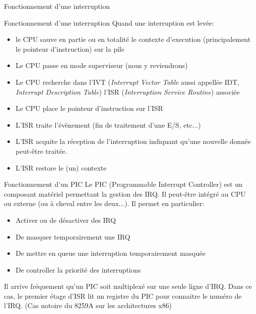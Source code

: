 \begin{frame}{Fonctionnement d'une interruption}
  \begin{center}
  \end{center}
\end{frame}

\begin{frame}{Fonctionnement d'une interruption}
  Quand une  interruption est levée:
  \begin{itemize}
  \item le CPU sauve en  partie ou en totalité le contexte d'execution
    (principalement le pointeur d'instruction) sur la pile
  \item Le CPU passe en mode superviseur (nous y reviendrons)
  \item  Le CPU  recherche dans  l'IVT (\emph{Interrupt  Vector Table}
    aussi  appellée  IDT,  \emph{Interrupt  Description  Table})  l'ISR
    (\emph{Interruption Service Routine}) associée
  \item Le CPU place le pointeur d'instruction sur l'ISR
  \item  L'ISR traite  l'évènement (fin  de traitement  d'une E/S,
    etc...)
  \item L'ISR acquite la  réception de l'interruption indiquant qu'une
    nouvelle  donnée peut-être  traitée.
  \item L'ISR restore le (un) contexte
  \end{itemize}
\end{frame}

\begin{frame}{Fonctionnement d'un PIC}
  Le PIC (Programmable Interrupt Controller) est un composant matériel
  permettant  la gestion  des  IRQ.  Il peut-être  intégré  au CPU  ou
  externe (ou à cheval entre les deux...). Il permet en particulier:
  \begin{itemize}
  \item Activer ou de désactiver des IRQ
  \item De masquer temporairement une IRQ
  \item De mettre en queue une interruption temporairement masquée
  \item De controller la priorité des interruptions
  \end{itemize}
  Il arrive fréquement  qu'un PIC soit multiplexé sur  une seule ligne
  d'IRQ. Dans  ce cas, le premier  étage d'ISR lit un  registre du PIC
  pour connaitre  le numéro de l'IRQ.   (Cas notoire du  8259A sur les
  architectures x86)

\end{frame}

